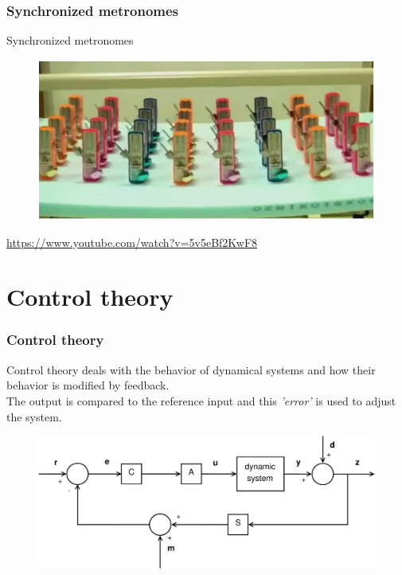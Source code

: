 \documentclass{beamer}
\begin{document}
\begin{frame}
\frametitle{Synchronized metronomes}
Synchronized metronomes
\begin{figure}
\includegraphics[scale=0.4]{synchronized_metronomes}
\end{figure}
\url{https://www.youtube.com/watch?v=5v5eBf2KwF8}
\end{frame}


%
%

\section{Control theory}

\begin{frame}
\frametitle{Control theory}
Control theory deals with the behavior of dynamical systems and how their behavior is modified by feedback.\\
The output is compared to the reference input and this \textit{'error'} is used to adjust the system. 
\bigskip
\begin{figure}
\includegraphics[width=1\linewidth]{full_system1}
\end{figure}
\end{frame}
\end{document}
